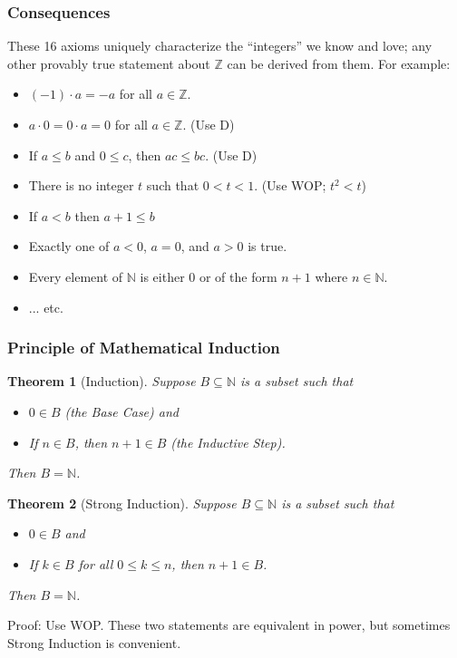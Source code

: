 \documentclass[handout]{beamer}
\newtheorem{thm}{Theorem}
\begin{document}
\begin{frame}
\frametitle{Consequences}

These 16 axioms uniquely characterize the ``integers'' we know and love; any other provably true statement about $\mathbb{Z}$ can be derived from them. For example: \pause

\begin{itemize}
\item $(-1) \cdot a = -a$ for all $a \in \mathbb{Z}$. \pause
\item $a \cdot 0 = 0 \cdot a = 0$ for all $a \in \mathbb{Z}$. \pause (Use D) \pause
\item If $a \leq b$ and $0 \leq c$, then $ac \leq bc$. \pause (Use D) \pause
\item There is no integer $t$ such that $0 < t < 1$. \pause (Use WOP; $t^2 < t$) \pause
\item If $a < b$ then $a+1 \leq b$ \pause
\item Exactly one of $a < 0$, $a = 0$, and $a > 0$ is true. \pause
\item Every element of $\mathbb{N}$ is either 0 or of the form $n+1$ where $n \in \mathbb{N}$. \pause
\item ... etc.
\end{itemize}
\end{frame}



\begin{frame}
\frametitle{Principle of Mathematical Induction}

\begin{thm}[Induction]
Suppose $B \subseteq \mathbb{N}$ is a subset such that
\begin{itemize}
\item $0 \in B$ (the \emph{Base Case}) and
\item If $n \in B$, then $n + 1 \in B$ (the \emph{Inductive Step}).
\end{itemize}
Then $B = \mathbb{N}$.
\end{thm}

\begin{thm}[Strong Induction]
Suppose $B \subseteq \mathbb{N}$ is a subset such that
\begin{itemize}
\item $0 \in B$ and
\item If $k \in B$ for all $0 \leq k \leq n$, then $n+1 \in B$.
\end{itemize}
Then $B = \mathbb{N}$.
\end{thm}

Proof: Use WOP. These two statements are equivalent in power, but sometimes Strong Induction is convenient.
\end{frame}
\end{document}
